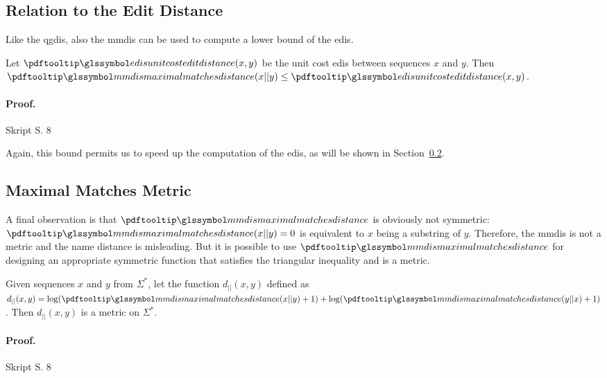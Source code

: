 \subsection{Relation to the Edit Distance}\label{subsec:relation-to-the-edit-distance}

Like the \gls{qgdis}, also the \gls{mmdis} can be used to compute a
lower bound of the \gls{edis}.

\begin{theo} \label{thm:theorem-1-5}
    Let $\edis(x, y)$ be the unit cost \gls{edis} between sequences $x$ and $y$.
    Then $\mmsym(x||y) \leq \edis(x, y)$.
    \paragraph{Proof.} Skript S. 8 %
\end{theo}

Again, this bound permits us to speed up the computation of the \gls{edis}, as will be
shown in Section~\ref{subsec:maximal-matches-metric}.

\subsection{Maximal Matches Metric}\label{subsec:maximal-matches-metric}
A final observation is that $\mmsym$ is obviously not symmetric: $\mmsym(x||y)  = 0$ is equivalent to
$x$ being a substring of $y$.
Therefore, the \gls{mmdis} is not a metric and the name distance is misleading.
But it is possible to use $\mmsym$ for designing an appropriate
symmetric function that satisfies the triangular inequality and is a metric.

\begin{theo} \label{thm:theorem-1-6}
    Given sequences $x$ and $y$ from $\Sigma^*$, let the function $d_{||} (x, y)$ defined as
    $d_{||} (x, y) = \log(\mmsym(x||y)+1) + \log(\mmsym(y||x)+1)$.
    Then $d_{||} (x, y)$ is a metric on $\Sigma^*$.
    \paragraph{Proof.} Skript S. 8 %
\end{theo}


